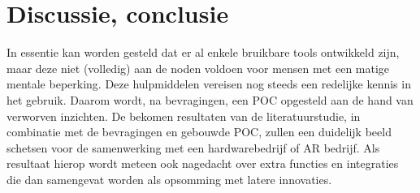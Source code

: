 \documentclass{hogent-article}
\begin{document}
    
    \section{Discussie, conclusie}%
    \label{sec:discussie-conclusie}
    In essentie kan worden gesteld dat er al enkele bruikbare tools ontwikkeld zijn, maar deze niet (volledig) aan de noden voldoen voor mensen met een matige mentale beperking. Deze hulpmiddelen vereisen nog steeds een redelijke kennis in het gebruik. Daarom wordt, na bevragingen, een POC opgesteld aan de hand van verworven inzichten. De bekomen resultaten van de literatuurstudie, in combinatie met de bevragingen en gebouwde POC, zullen een duidelijk beeld schetsen voor de samenwerking met een hardwarebedrijf of AR bedrijf. Als resultaat hierop wordt meteen ook nagedacht over extra functies en integraties die dan samengevat worden als opsomming met latere innovaties.

    
    
    
    \printbibliography[heading=bibintoc]
\end{document}
